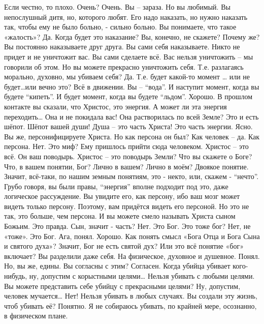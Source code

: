 \documentclass{extbook}
\newcommand{\soul}[1]{{#1}}
\newcommand{\people}[1]{{#1}}
\begin{document}
\soul{Если честно, то плохо.}
\people{Очень?}
\soul{Очень. Вы – зараза.  Но вы любимый. Вы непослушный дитя, но, которого любят. Его надо наказать, но нужно наказать так, чтобы ему не было больно, - сильно больно. Вы понимаете, что такое «жалость»?}
\people{Да.  Когда будет это наказание? Вы, конечно, не скажете?}
\soul{Почему же? Вы постоянно наказываете друг друга. Вы сами себя наказываете. Никто не придет и не уничтожит вас. Вы сами сделаете всё. Вас нельзя уничтожить – мы говорили об этом. Но вы можете прекрасно уничтожить себя.}
\people{Т.е. разлагаясь морально,  духовно,  мы убиваем себя?}
\soul{Да.}
\people{Т.е. будет какой-то момент … или не будет…или вечно это?}
\soul{Всё в движении. Вы – ``вода''.  И наступит момент, когда вы будете ``кипеть''. И будет момент, когда вы будете ``льдом''.}
\people{Хорошо. В прошлом контакте вы сказали, что Христос, это энергия. А может ли эта энергия переходить…}
\soul{Она и не покидала вас!}
\people{Она растворилась по всей Земле?}
\soul{Это и есть шёпот. Шёпот вашей души! Душа – это часть Христа! Это часть энергии.}
\people{Ясно.}
\soul{Вы же, персонифицируете Христа.}
\people{Но как персона он был?}
\soul{Как человек – да.}
\people{Как персона.}
\soul{Нет.}
\people{Это миф?}
\soul{Ему пришлось прийти сюда человеком. Христос – это всё. Он ваш поводырь.}
\people{Христос – это поводырь Земли?}
\soul{Что вы скажете о Боге? Что, в вашем понятии, Бог? Лично в вашем?}
\people{Лично в моём? Двоякое понятие. Значит, всё-таки, по нашим земным понятиям, это - некто, или, скажем - ``нечто''.   Грубо говоря, вы были правы,  ``энергия'' вполне подходит под это, даже логическое рассуждение.}
\soul{Вы увидите его, как персону, ибо ваш мозг может видеть только персону. Поэтому, вам придётся видеть его персоной. Но это не так, это больше, чем персона. И вы можете смело называть Христа сыном Божьим. Это правда.}
\people{Сын, значит - часть?}
\soul{Нет. Это Бог.}
\people{Это тоже бог?}
\soul{Нет, не «тоже». Это Бог.}
\people{Ага, понял. Хорошо. Как понять смысл «Бога Отца и Бога Сына и святого духа»? Значит, Бог не есть святой дух? Или это всё понятие «бог» включает?}
\soul{Вы разделили даже себя. На физическое, духовное и душевное.}
\people{Понял.}
\soul{Но, вы же, едины. Вы согласны с этим?}
\people{Согласен. Когда убийца убивает кого-нибудь, ну, допустим с корыстными целями…}
\soul{Нельзя убивать с любыми целями. Вы можете представить себе убийцу с прекрасными целями?}
\people{Ну, допустим, человек мучается…}
\soul{Нет!  Нельзя убивать в любых случаях. Вы создали эту жизнь, чтоб убивать её?}
\people{Понятно. Я не собираюсь убивать, по крайней мере, осознанно, в физическом плане.}
\end{document}

